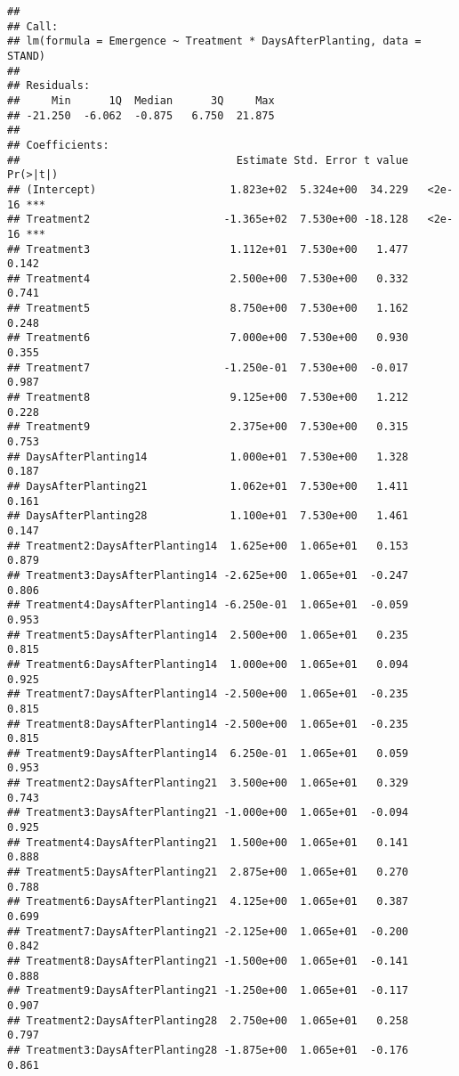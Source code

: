 \documentclass[
]{article}
\begin{document}
\begin{verbatim}
## 
## Call:
## lm(formula = Emergence ~ Treatment * DaysAfterPlanting, data = STAND)
## 
## Residuals:
##     Min      1Q  Median      3Q     Max 
## -21.250  -6.062  -0.875   6.750  21.875 
## 
## Coefficients:
##                                  Estimate Std. Error t value Pr(>|t|)    
## (Intercept)                     1.823e+02  5.324e+00  34.229   <2e-16 ***
## Treatment2                     -1.365e+02  7.530e+00 -18.128   <2e-16 ***
## Treatment3                      1.112e+01  7.530e+00   1.477    0.142    
## Treatment4                      2.500e+00  7.530e+00   0.332    0.741    
## Treatment5                      8.750e+00  7.530e+00   1.162    0.248    
## Treatment6                      7.000e+00  7.530e+00   0.930    0.355    
## Treatment7                     -1.250e-01  7.530e+00  -0.017    0.987    
## Treatment8                      9.125e+00  7.530e+00   1.212    0.228    
## Treatment9                      2.375e+00  7.530e+00   0.315    0.753    
## DaysAfterPlanting14             1.000e+01  7.530e+00   1.328    0.187    
## DaysAfterPlanting21             1.062e+01  7.530e+00   1.411    0.161    
## DaysAfterPlanting28             1.100e+01  7.530e+00   1.461    0.147    
## Treatment2:DaysAfterPlanting14  1.625e+00  1.065e+01   0.153    0.879    
## Treatment3:DaysAfterPlanting14 -2.625e+00  1.065e+01  -0.247    0.806    
## Treatment4:DaysAfterPlanting14 -6.250e-01  1.065e+01  -0.059    0.953    
## Treatment5:DaysAfterPlanting14  2.500e+00  1.065e+01   0.235    0.815    
## Treatment6:DaysAfterPlanting14  1.000e+00  1.065e+01   0.094    0.925    
## Treatment7:DaysAfterPlanting14 -2.500e+00  1.065e+01  -0.235    0.815    
## Treatment8:DaysAfterPlanting14 -2.500e+00  1.065e+01  -0.235    0.815    
## Treatment9:DaysAfterPlanting14  6.250e-01  1.065e+01   0.059    0.953    
## Treatment2:DaysAfterPlanting21  3.500e+00  1.065e+01   0.329    0.743    
## Treatment3:DaysAfterPlanting21 -1.000e+00  1.065e+01  -0.094    0.925    
## Treatment4:DaysAfterPlanting21  1.500e+00  1.065e+01   0.141    0.888    
## Treatment5:DaysAfterPlanting21  2.875e+00  1.065e+01   0.270    0.788    
## Treatment6:DaysAfterPlanting21  4.125e+00  1.065e+01   0.387    0.699    
## Treatment7:DaysAfterPlanting21 -2.125e+00  1.065e+01  -0.200    0.842    
## Treatment8:DaysAfterPlanting21 -1.500e+00  1.065e+01  -0.141    0.888    
## Treatment9:DaysAfterPlanting21 -1.250e+00  1.065e+01  -0.117    0.907    
## Treatment2:DaysAfterPlanting28  2.750e+00  1.065e+01   0.258    0.797    
## Treatment3:DaysAfterPlanting28 -1.875e+00  1.065e+01  -0.176    0.861    

\end{verbatim}
\end{document}
